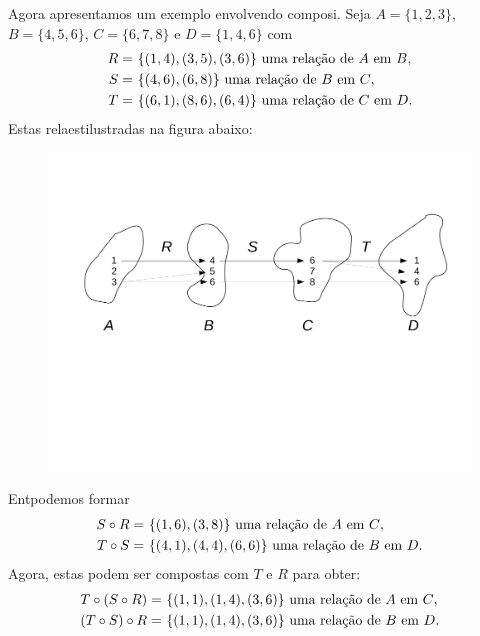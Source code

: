 Agora apresentamos um exemplo envolvendo composi\caoi. Seja $A=\{1,2,3\}$, $B=\{4,5,6\}$, $C=\{6,7,8\}$ e $D=\{1,4,6\}$ com
\begin{equation*}
 \begin{aligned}
R=&\espaco\{(1,4),(3,5),(3,6)\} \textrm{ uma rela\cao de $A$ em $B$},\\
S=&\espaco\{(4,6),(6,8)\} \textrm{ uma rela\cao de $B$ em $C$},\\
T=&\espaco\{(6,1),(8,6),(6,4)\} \textrm{ uma rela\cao de $C$ em $D$}.
 \end{aligned}
\end{equation*} 
Estas rela\coes est\ao ilustradas na figura abaixo:
\begin{figure}[h]
\begin{center}
\includegraphics[width=15cm,trim={1.5cm 10cm 1.5cm 4cm},clip]{./figuras/figure23.pdf}
\end{center}
\end{figure}

Ent\ao podemos formar
\begin{equation*}
 \begin{aligned}
S\bola R=&\espaco\{(1,6),(3,8)\} \textrm{ uma rela\cao de $A$ em $C$},\\
T\bola S=&\espaco\{(4,1),(4,4),(6,6)\} \textrm{ uma rela\cao de $B$ em $D$}.
 \end{aligned}
\end{equation*}
Agora, estas podem ser compostas com $T$ e $R$ para obter:
\begin{equation*}
 \begin{aligned}
T\bola(S\bola R)=&\espaco\{(1,1),(1,4),(3,6)\} \textrm{ uma rela\cao de $A$ em $C$},\\
(T\bola S)\bola R=&\espaco\{(1,1),(1,4),(3,6)\} \textrm{ uma rela\cao de $B$ em $D$}.
 \end{aligned}
\end{equation*}

